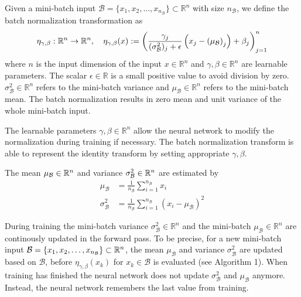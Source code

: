 \documentclass[twoside,a4paper]{article}
\begin{document}

Given a mini-batch input $\mathcal{B} = \{  x_1, x_2, \dots, x_{n_{\mathcal{B}}} \} \subset \mathbb{R}^{n}$ 
with size $n_{\mathcal{B}}$, we define the batch normalization transformation as
\begin{equation*}
	\eta_{\gamma, \beta} : \mathbb{R}^n \to \mathbb{R}^n,\quad
	\eta_{\gamma, \beta}(x) 
	:= \left( \frac{\gamma_j}{(\sigma^2_\mathcal{B})_j + \epsilon} 
	\left( x_j - \left( \mu_\mathcal{B} \right)_j \right) + \beta_j \right)_{j=1}^n
\end{equation*}
where $n$ is the input dimension of the input $x \in \mathbb{R}^n$ and $\gamma, \beta \in \mathbb{R}^{n}$ 
are learnable parameters.
The scalar $\epsilon \in \mathbb{R}$ is a small positive value to avoid division by zero.
$\sigma^2_\mathcal{B} \in \mathbb{R}^{n}$ refers to the mini-batch variance and
$\mu_\mathcal{B} \in \mathbb{R}^{n}$ refers to the mini-batch mean. The batch normalization results 
in zero mean and unit variance of the whole mini-batch input.

The learnable parameters $\gamma, \beta \in \mathbb{R}^{n}$ allow the neural network to modify
the normalization during training if necessary. The batch normalization transform is able to 
represent the identity transform by setting appropriate $\gamma, \beta$.

The mean $\mu_\mathcal{B} \in \mathbb{R}^n$ and variance $\sigma^2_\mathcal{B} \in \mathbb{R}^n$ are estimated by
\begin{align*}
	\mu_\mathcal{B} &= \frac{1}{n_{\mathcal{B}}} \sum_{i=1}^{n_{\mathcal{B}}} x_i \\
	\sigma^2_\mathcal{B} &= \frac{1}{n_{\mathcal{B}}} 
	\sum_{i=1}^{n_{\mathcal{B}}} (x_i - \mu_\mathcal{B})^2
\end{align*}

During training the mini-batch variance $\sigma^2_\mathcal{B} \in \mathbb{R}^{n}$ and
the mini-batch $\mu_\mathcal{B} \in \mathbb{R}^{n}$ are continously updated in the forward pass.
To be precise, for a new mini-batch input
$\mathcal{B} = \{ x_1, x_2, \dots, x_{n_{\mathcal{B}}} \} \subset \mathbb{R}^n$, 
the mean $\mu_\mathcal{B}$ and variance $\sigma^2_\mathcal{B}$
are updated based on $\mathcal{B}$, before $\eta_{\gamma, \beta}(x_k)$ for
$x_k \in \mathcal{B}$ is evaluated (see Algorithm 1).
When training has finished the neural network does not update $\sigma_\mathcal{B}^2$ 
and $\mu_\mathcal{B}$ anymore. Instead, the neural network remembers the last value from training.
\end{document}
